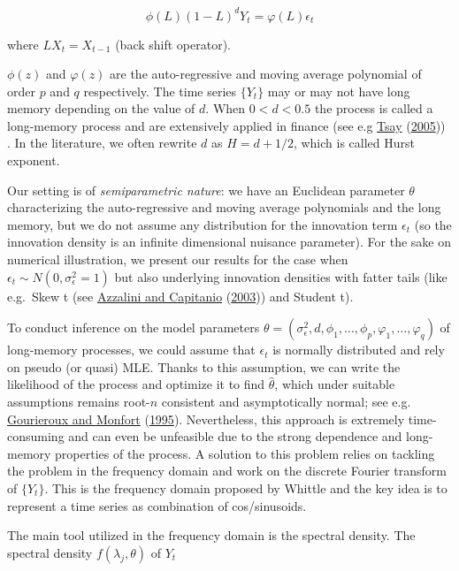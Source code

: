 \documentclass[
  11pt,
]{article}
\begin{document}
\[
\phi(L)(1-L)^{d} Y_{t}=\varphi(L) \epsilon_{t}
\]

where \(LX_t = X_{t-1}\) (back shift operator).

\(\phi(z)\) and \(\varphi(z)\) are the auto-regressive and moving
average polynomial of order \(p\) and \(q\) respectively. The time
series \(\{Y_t\}\) may or may not have long memory depending on the
value of \(d\). When \(0 < d < 0.5\) the process is called a long-memory
process and are extensively applied in finance (see e.g
\protect\hyperlink{ref-tsay2005analysis}{Tsay}
(\protect\hyperlink{ref-tsay2005analysis}{2005})) . In the literature,
we often rewrite \(d\) as \(H = d +1/2\), which is called Hurst
exponent.

Our setting is of \emph{semiparametric nature}: we have an Euclidean
parameter \(\theta\) characterizing the auto-regressive and moving
average polynomials and the long memory, but we do not assume any
distribution for the innovation term \(\epsilon_{t}\) (so the innovation
density is an infinite dimensional nuisance parameter). For the sake on
numerical illustration, we present our results for the case when
\(\epsilon_{t} \sim N\left(0, \sigma_{\epsilon}^{2}=1\right)\) but also
underlying innovation densities with fatter tails (like e.g.~Skew t (see
\protect\hyperlink{ref-azzalini2003distributions}{Azzalini and
Capitanio} (\protect\hyperlink{ref-azzalini2003distributions}{2003}))
and Student t).

To conduct inference on the model parameters
\(\theta=\left(\sigma_{\epsilon}^{2}, d, \phi_{1}, \ldots, \phi_{p}, \varphi_{1}, \ldots, \varphi_{q}\right)\)
of long-memory processes, we could assume that \(\epsilon_t\) is
normally distributed and rely on pseudo (or quasi) MLE. Thanks to this
assumption, we can write the likelihood of the process and optimize it
to find \(\hat \theta\), which under suitable assumptions remains
root-\(n\) consistent and asymptotically normal; see e.g.
\protect\hyperlink{ref-gourieroux1995statistics}{Gourieroux and Monfort}
(\protect\hyperlink{ref-gourieroux1995statistics}{1995}). Nevertheless,
this approach is extremely time-consuming and can even be unfeasible due
to the strong dependence and long-memory properties of the process. A
solution to this problem relies on tackling the problem in the frequency
domain and work on the discrete Fourier transform of \(\{Y_t\}\). This
is the frequency domain proposed by Whittle and the key idea is to
represent a time series as combination of cos/sinusoids.

The main tool utilized in the frequency domain is the spectral density.
The spectral density \(f(\lambda_j, \theta)\) of \(Y_t\)
\end{document}
